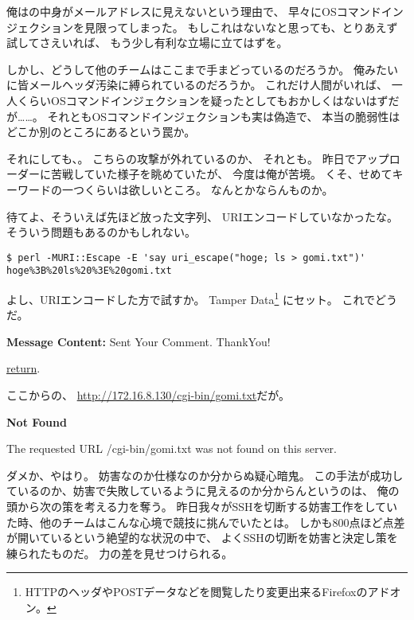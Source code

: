 俺はの中身がメールアドレスに見えないという理由で、
早々にOSコマンドインジェクションを見限ってしまった。
もしこれはないなと思っても、とりあえず試してさえいれば、
もう少し有利な立場に立てはずを。

しかし、どうして他のチームはここまで手まどっているのだろうか。
俺みたいに皆メールヘッダ汚染に縛られているのだろうか。
これだけ人間がいれば、
一人くらいOSコマンドインジェクションを疑ったとしてもおかしくはないはずだが……。
それともOSコマンドインジェクションも実は偽造で、
本当の脆弱性はどこか別のところにあるという罠か。

それにしても、。
こちらの攻撃が外れているのか、
それとも。
昨日でアップローダーに苦戦していた様子を眺めていたが、
今度は俺が苦境。
くそ、せめてキーワードの一つくらいは欲しいところ。
なんとかならんものか。

待てよ、そういえば先ほど放った文字列、
URIエンコードしていなかったな。
そういう問題もあるのかもしれない。

\begin{lstlisting}
$ perl -MURI::Escape -E 'say uri_escape("hoge; ls > gomi.txt")'
hoge%3B%20ls%20%3E%20gomi.txt
\end{lstlisting}

よし、URIエンコードした方で試すか。
Tamper Data\footnote{HTTPのヘッダやPOSTデータなどを閲覧したり変更出来るFirefoxのアドオン。}%
にセット。
これでどうだ。

\begin{itembox}[c]{\textbf{Message Content:}}
Sent Your Comment. ThankYou!

\underline{return}. 
\end{itembox}

ここからの、
\url{http://172.16.8.130/cgi-bin/gomi.txt}だが。

\begin{itembox}[c]{\textbf{Not Found}}

The requested URL /cgi-bin/gomi.txt was not found on this server.
\end{itembox}

ダメか、やはり。
妨害なのか仕様なのか分からぬ疑心暗鬼。
この手法が成功しているのか、妨害で失敗しているように見えるのか分からんというのは、
俺の頭から次の策を考える力を奪う。
昨日我々がSSHを切断する妨害工作をしていた時、他のチームはこんな心境で競技に挑んでいたとは。
しかも800点ほど点差が開いているという絶望的な状況の中で、
よくSSHの切断を妨害と決定し策を練られたものだ。
力の差を見せつけられる。


